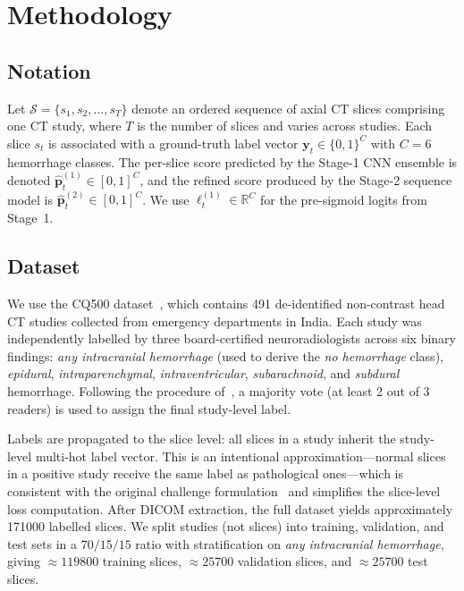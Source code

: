 \section{Methodology}
\label{sec:methodology}

\subsection{Notation}

Let $\mathcal{S} = \{s_1, s_2, \ldots, s_T\}$ denote an ordered sequence
of axial CT slices comprising one CT study, where $T$ is the number of
slices and varies across studies.
Each slice $s_t$ is associated with a ground-truth label vector
$\mathbf{y}_t \in \{0,1\}^C$ with $C=6$ hemorrhage classes.
The per-slice score predicted by the Stage-1 CNN ensemble is denoted
$\hat{\mathbf{p}}_t^{(1)} \in [0,1]^C$, and the refined score produced by
the Stage-2 sequence model is $\hat{\mathbf{p}}_t^{(2)} \in [0,1]^C$.
We use $\boldsymbol{\ell}_t^{(1)} \in \mathbb{R}^C$ for the pre-sigmoid
logits from Stage~1.

\subsection{Dataset}

We use the CQ500 dataset~\cite{chilamkurthy2018cq500}, which contains
491 de-identified non-contrast head CT studies collected from emergency
departments in India.
Each study was independently labelled by three board-certified neuroradiologists
across six binary findings: \emph{any intracranial hemorrhage} (used to derive
the \emph{no hemorrhage} class), \emph{epidural}, \emph{intraparenchymal},
\emph{intraventricular}, \emph{subarachnoid}, and \emph{subdural} hemorrhage.
Following the procedure of~\cite{wang2021deeplearning}, a majority vote
(at least 2 out of 3 readers) is used to assign the final study-level label.

Labels are propagated to the slice level: all slices in a study inherit the
study-level multi-hot label vector.
This is an intentional approximation---normal slices in a positive study
receive the same label as pathological ones---which is consistent with the
original challenge formulation~\cite{rsna2019} and simplifies the slice-level
loss computation.
After DICOM extraction, the full dataset yields approximately
\num{171000} labelled slices.
We split studies (not slices) into training, validation, and test sets in a
$70/15/15$ ratio with stratification on \emph{any intracranial hemorrhage},
giving $\approx\num{119800}$ training slices,
$\approx\num{25700}$ validation slices, and
$\approx\num{25700}$ test slices.

